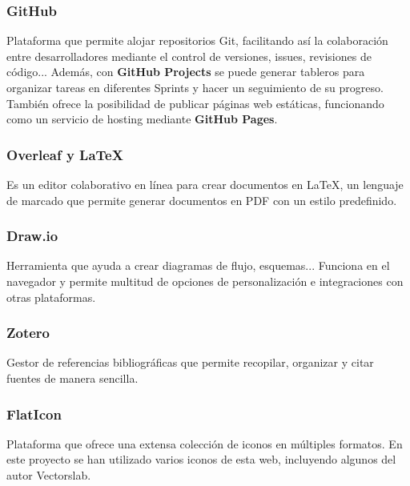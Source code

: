\subsubsection{GitHub}
\label{subsubsec:GitHub}
Plataforma que permite alojar repositorios Git, facilitando así la colaboración entre desarrolladores mediante el control de versiones, issues, revisiones de código... Además, con \textbf{GitHub Projects} se puede generar tableros para organizar tareas en diferentes Sprints y hacer un seguimiento de su progreso. También ofrece la posibilidad de publicar páginas web estáticas, funcionando como un servicio de hosting mediante \textbf{GitHub Pages}.

\subsubsection{Overleaf y LaTeX}
\label{subsubsec:Overleaf}
Es un editor colaborativo en línea para crear documentos en LaTeX, un lenguaje de marcado que permite generar documentos en PDF con un estilo predefinido.

\subsubsection{Draw.io}
\label{subsubsec:Draw}
Herramienta que ayuda a crear diagramas de flujo, esquemas... Funciona en el navegador y permite multitud de opciones de personalización e integraciones con otras plataformas.

\subsubsection{Zotero}
\label{subsubsec:Zotero}
Gestor de referencias bibliográficas que permite recopilar, organizar y citar fuentes de manera sencilla.

\subsubsection{FlatIcon}
\label{subsubsec:FlatIcon}
Plataforma que ofrece una extensa colección de iconos en múltiples formatos. En este proyecto se han utilizado varios iconos de esta web, incluyendo algunos del autor Vectorslab.
 